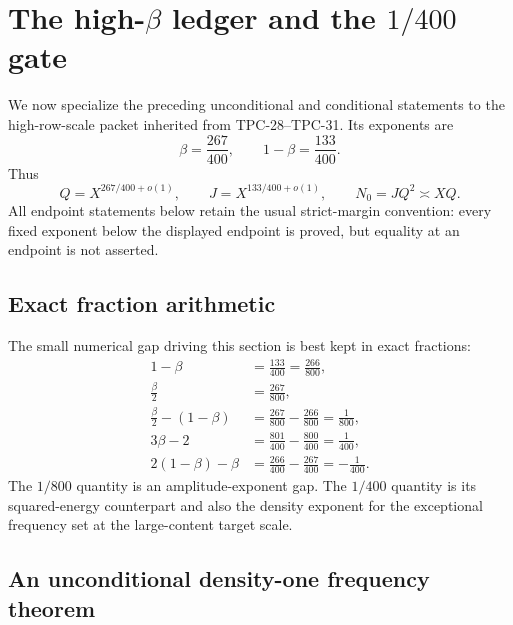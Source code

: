 \section{\texorpdfstring{The high-\(\beta\) ledger and the \(1/400\)
gate}{The high-beta ledger and the 1/400 gate}}
\label{sec:tpc32-high-beta-ledger}

We now specialize the preceding unconditional and conditional statements
to the high-row-scale packet inherited from TPC-28--TPC-31.  Its exponents
are
\begin{equation}
 \boxed{
 \beta=\frac{267}{400},
 \qquad
 1-\beta=\frac{133}{400}.}
 \label{eq:tpc32-high-beta-scales}
\end{equation}
Thus
\begin{equation}
 Q=X^{267/400+o(1)},
 \qquad
 J=X^{133/400+o(1)},
 \qquad
 N_0=JQ^2\asymp XQ.
 \label{eq:tpc32-high-beta-QJ}
\end{equation}
All endpoint statements below retain the usual strict-margin
convention: every fixed exponent below the displayed endpoint is
proved, but equality at an endpoint is not asserted.

\subsection{Exact fraction arithmetic}

The small numerical gap driving this section is best kept in exact
fractions:
\begin{align}
 1-\beta
 &=\frac{133}{400}=\frac{266}{800},
 \label{eq:tpc32-high-large-content-margin}\\
 \frac\beta2
 &=\frac{267}{800},
 \label{eq:tpc32-high-rms-margin}\\
 \frac\beta2-(1-\beta)
 &=\frac{267}{800}-\frac{266}{800}
 =\boxed{\frac1{800}},
 \label{eq:tpc32-high-amplitude-slack}\\
 3\beta-2
 &=\frac{801}{400}-\frac{800}{400}
 =\boxed{\frac1{400}},
 \label{eq:tpc32-high-energy-slack}\\
 2(1-\beta)-\beta
 &=\frac{266}{400}-\frac{267}{400}
 =-\boxed{\frac1{400}}.
 \label{eq:tpc32-high-exception-density-exponent}
\end{align}
The $1/800$ quantity is an amplitude-exponent gap.  The $1/400$
quantity is its squared-energy counterpart and also the density exponent
for the exceptional frequency set at the large-content target scale.

\subsection{An unconditional density-one frequency theorem}

